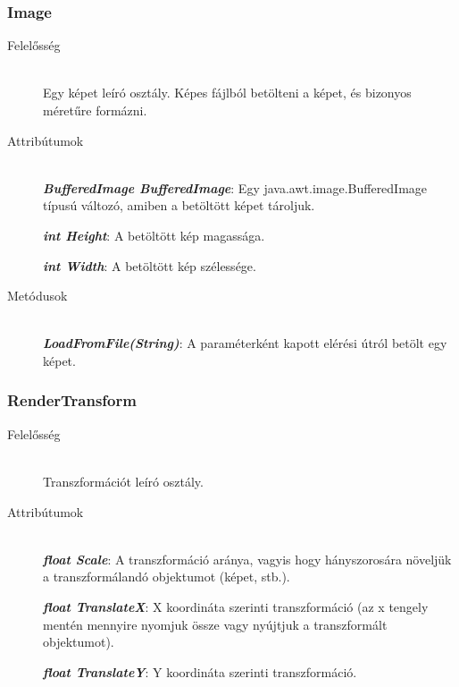 \subsubsection{Image}
	\begin{description}
		\item[Felelősség] \hfill \\
		Egy képet leíró osztály. Képes fájlból betölteni a képet, és bizonyos méretűre formázni.
		
		\item[Attribútumok]\hfill \\
		
		\textbf{\emph{BufferedImage BufferedImage}}: Egy java.awt.image.BufferedImage típusú változó, amiben a betöltött képet tároljuk.
		
		\textbf{\emph{int Height}}: A betöltött kép magassága.	
		
		\textbf{\emph{int Width}}: A betöltött kép szélessége.	
				
		\item[Metódusok]\hfill \\
		\textbf{\emph{LoadFromFile(String)}}: A paraméterként kapott elérési útról betölt egy képet.

	\end{description}
	
\subsubsection{RenderTransform}
	\begin{description}
		\item[Felelősség] \hfill \\
		Transzformációt leíró osztály.
		
		\item[Attribútumok]\hfill \\
		\textbf{\emph{float Scale}}: A transzformáció aránya, vagyis hogy hányszorosára növeljük a transzformálandó objektumot (képet, stb.).
		
		\textbf{\emph{float TranslateX}}: X koordináta szerinti transzformáció (az x tengely mentén mennyire nyomjuk össze vagy nyújtjuk a transzformált objektumot).	
		
		\textbf{\emph{float TranslateY}}: Y koordináta szerinti transzformáció.	
	\end{description}

